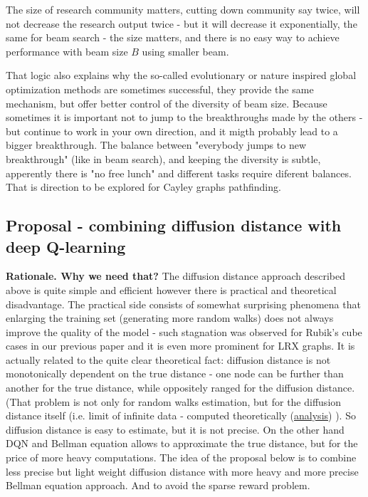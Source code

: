 \documentclass[atmp]{ipart_v1}
\numberwithin{equation}{section}
\theoremstyle{plain}%
\begin{document}
The size of research community matters, cutting down community say twice, will not decrease the research output twice - but it will decrease it exponentially, the same for beam search - the size matters, and there is no easy way to achieve performance with beam size $B$ using smaller beam.

That logic also explains why the so-called evolutionary or nature inspired global optimization methods are sometimes successful, they provide the same mechanism, but offer better control of the diversity of beam size. Because sometimes it is important not to jump to the breakthroughs made by the others - but continue to work in your own direction, and it migth probably lead to a bigger breakthrough. The balance between "everybody jumps to new breakthrough" (like in beam search), and keeping the diversity is subtle, apperently there is "no free lunch" and different tasks require diferent balances. That is direction to be explored for Cayley graphs pathfinding. 



\subsection{Proposal -  combining diffusion distance with deep Q-learning}

{\bf Rationale. Why we need that?} The diffusion distance approach described above is quite simple and efficient however there is practical and theoretical disadvantage. The practical side consists of somewhat surprising phenomena that enlarging the training set (generating more random walks) does not always improve the quality of the model - such stagnation was  observed for Rubik's cube cases in our previous paper and it is even more prominent for LRX graphs. It is actually related to the quite clear theoretical fact: diffusion distance is not monotonically dependent on the true distance - one node can be further than another for the true distance, while oppositely ranged for the diffusion distance. (That problem is not only for random walks estimation, but for the diffusion distance itself (i.e. limit of infinite data - computed theoretically (\href{https://www.kaggle.com/code/fedmug/lrx-diffusion-distance-analysis}{analysis}) ). %
So diffusion distance is easy to estimate, but it is not precise. On the other hand DQN and Bellman equation allows to approximate the true distance, but for the price of more heavy computations. 
The idea of the proposal below is to combine less precise but light weight diffusion distance with more heavy and more precise Bellman equation approach. And to avoid the sparse reward problem.
\end{document}
